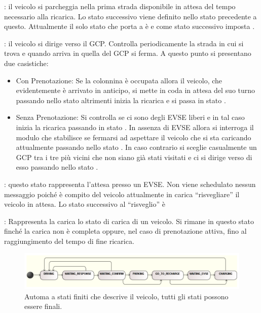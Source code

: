 \begin{description}
	\item {}: il veicolo si parcheggia nella prima strada disponibile in attesa del tempo necessario alla ricarica. Lo stato successivo viene definito nello stato precedente a questo. Attualmente il solo stato che porta a  è  e come stato successivo imposta .
	\item {}: il veicolo si dirige verso il GCP. Controlla periodicamente la strada in cui si trova e quando arriva in quella del GCP  si ferma. A questo punto si presentano due casistiche:
	\begin{itemize}
		\item{Con Prenotazione}: Se la colonnina è occupata allora il veicolo, che evidentemente è arrivato in anticipo, si mette in coda in attesa del suo turno passando nello stato  altrimenti inizia la ricarica e si passa in stato .
		\item{Senza Prenotazione}: Si controlla se ci sono degli EVSE liberi e in tal caso inizia la ricarica passando in stato . In assenza di EVSE allora si interroga il modulo  che stabilisce se fermarsi ad aspettare il veicolo che si sta caricando attualmente passando nello stato . In caso contrario si sceglie casualmente un GCP tra i tre più vicini che non siano già stati visitati e ci si dirige verso di esso passando nello stato . 
	\end{itemize}
	\item {}: questo stato rappresenta l'attesa presso un EVSE. Non viene schedulato nessun messaggio poiché è compito del veicolo attualmente in carica ``risvegliare'' il veicolo in attesa. Lo stato successivo al ``risveglio'' è 
	\item {}: Rappresenta la carica lo stato di carica di un veicolo. Si rimane in questo stato finché la carica non è completa oppure, nel caso di prenotazione attiva, fino al raggiungimento del tempo di fine ricarica.
\end{description}
	
\begin{figure}
	\centering
	\includegraphics[width=1.0\textwidth]{assets/car-fsmd.png}
	\caption{Automa a stati finiti che descrive il veicolo, tutti gli stati possono essere finali.}
	\label{fig:car-fsmd}
\end{figure}

